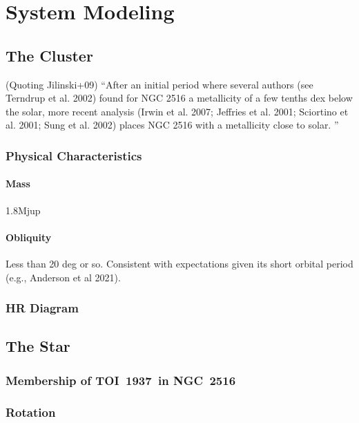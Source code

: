 \documentclass[12pt,twocolumn,tighten]{aastex63}
\newcommand{\tn}{TOI~1937} %
\newcommand{\cn}{NGC~2516} %
\begin{document}
\section{System Modeling}
\label{sec:system}

\subsection{The Cluster}
\label{subsec:cluster}

(Quoting Jilinski+09)
``After an initial period where several authors (see Terndrup et al.
2002) found for NGC 2516 a metallicity of a few tenths dex below the
solar, more recent analysis (Irwin et al. 2007; Jeffries et al.  2001;
Sciortino et al. 2001; Sung et al. 2002) places NGC 2516 with a
metallicity close to solar. ''

\subsubsection{Physical Characteristics}
\label{subsec:clusterchar}

\paragraph{Mass} 1.8Mjup

\paragraph{Obliquity} Less than 20 deg or so. Consistent with
expectations given its short orbital period (e.g., Anderson et al
2021). 

\subsubsection{HR Diagram}
\label{subsec:hr}

\subsection{The Star}
\label{subsec:star}

\subsubsection{Membership of \tn\ in \cn}
\label{subsec:member}

\subsubsection{Rotation}
\end{document}
